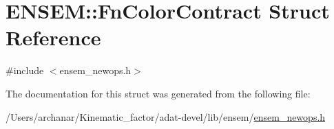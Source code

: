 \hypertarget{structENSEM_1_1FnColorContract}{}\section{E\+N\+S\+EM\+:\+:Fn\+Color\+Contract Struct Reference}
\label{structENSEM_1_1FnColorContract}


{\ttfamily \#include $<$ensem\+\_\+newops.\+h$>$}



The documentation for this struct was generated from the following file\+:\begin{DoxyCompactItemize}
\item 
/\+Users/archanar/\+Kinematic\+\_\+factor/adat-\/devel/lib/ensem/\mbox{\hyperlink{adat-devel_2lib_2ensem_2ensem__newops_8h}{ensem\+\_\+newops.\+h}}\end{DoxyCompactItemize}
